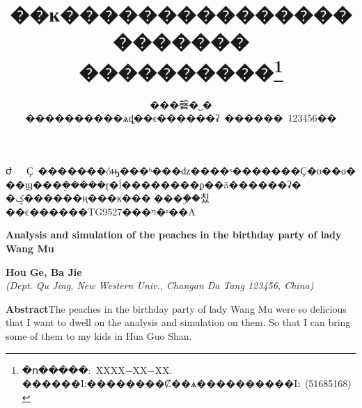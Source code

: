 \documentclass[a4paper,UTF8]{ctexart} %
\title{\huge{��ĸ����������������������\\
����������}\thanks{�ո�����:~XXXX$-$XX$-$XX. ������Ŀ��������Ȼ��ѧ����������Ŀ~(51685168)}}
\author{���磬�˽�\\[2pt]
\normalsize
����������ѧȡ��ϵ������ʡ~������~123456�� \\[2pt]}
\date{}  %
\begin{document}
\begin{CJK*}{GBK}{song}
\newcommand{\supercite}[1]{\textsuperscript{\cite{#1}}}
\maketitle

\setlength{\oddsidemargin}{ 1cm}  %
\setlength{\evensidemargin}{\oddsidemargin}
\setlength{\textwidth}{13.50cm}
\vspace{-.8cm}
\begin{center}
\parbox{\textwidth}{
ժ~~~Ҫ\quad {}~�������óԣ���ʱ���ǳ����ˣ�������Ҫ�о��о���ϣ���ܸ�����ɽ�ĺ��������ϼ��ã������ʡ�\\
�ؼ���\quad{}���ң���ĸ������ۣ��칬\\
��ͼ������\quad TG9527\qquad  {}���ױ�ʶ��\quad A}
\end{center}
\vspace{.1cm}
\begin{center}
\parbox{\textwidth}{
{\large{\textbf{Analysis and simulation of the peaches in the birthday party of lady Wang Mu}}}\\
\vspace{-0.5cm}
\begin{center}
\textbf{Hou Ge, Ba Jie}\\[2pt]
\small{\textit{(Dept. Qu Jing, New Western Univ., Changan Da Tang 123456, China)}}\\[2pt]
\end{center}
{\small{\textbf{Abstract}\quad The peaches in the birthday party of lady Wang Mu were so delicious that I want to dwell on the analysis and simulation on them. So that I can bring some of them to my kids in Hua Guo Shan.\\
}}}
\end{center}
\end{CJK*}
\end{document}
